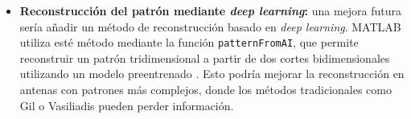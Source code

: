 \begin{itemize}
    \par\medskip
    \textbf{Nota: Esto lo leí en el TFG que me pasasteis como referencia y José Javier dijo que podíamos estudiarlo llegado el momento, pero jamás llegamos a volver a hablarlo, por lo que lo he metido como trabajo futuro. He cogido la referencia del TFG para sacar la definición también de ahí.}
    \par\medskip

    \item \textbf{Reconstrucción del patrón mediante \textit{deep learning}:} una mejora futura sería añadir un método de reconstrucción basado en \textit{deep learning}. MATLAB utiliza esté método mediante la función \texttt{patternFromAI}, que permite reconstruir un patrón tridimensional a partir de dos cortes bidimensionales utilizando un modelo preentrenado \cite{mathworks_patternfromai}. Esto podría mejorar la reconstrucción en antenas con patrones más complejos, donde los métodos tradicionales como Gil o Vasiliadis pueden perder información.
\end{itemize}


